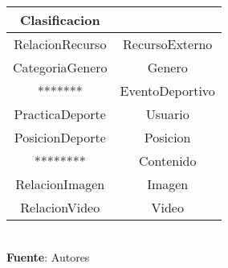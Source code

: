 \begin{table}[!htb]
\begin{center}
{\begin{tabular}{|p{4cm}|p{4cm}|p{4cm}|p{4cm}|}
			\multicolumn{2}{c|}{Clasificacion} \\
			\hline
			\multicolumn{2}{|c|}{RelacionRecurso} & 
			\multicolumn{2}{c|}{RecursoExterno} \\
			\hline
			\multicolumn{2}{|c|}{CategoriaGenero} & 
			\multicolumn{2}{c|}{Genero} \\
			\hline
			\multicolumn{2}{|c|}{*******} & 
			\multicolumn{2}{c|}{EventoDeportivo} \\
			\hline
			\multicolumn{2}{|c|}{PracticaDeporte} & 
			\multicolumn{2}{c|}{Usuario} \\
			\hline
			\multicolumn{2}{|c|}{PosicionDeporte} & 
			\multicolumn{2}{c|}{Posicion} \\
			\hline
			\multicolumn{2}{|c|}{********} & 
			\multicolumn{2}{c|}{Contenido} \\
			\hline
			\multicolumn{2}{|c|}{RelacionImagen} & 
			\multicolumn{2}{c|}{Imagen} \\
			\hline
			\multicolumn{2}{|c|}{RelacionVideo} & 
			\multicolumn{2}{c|}{Video} \\
			\hline
		\end{tabular}
		} \\
		\textbf{Fuente}: Autores
	\end{center}
\end{table}